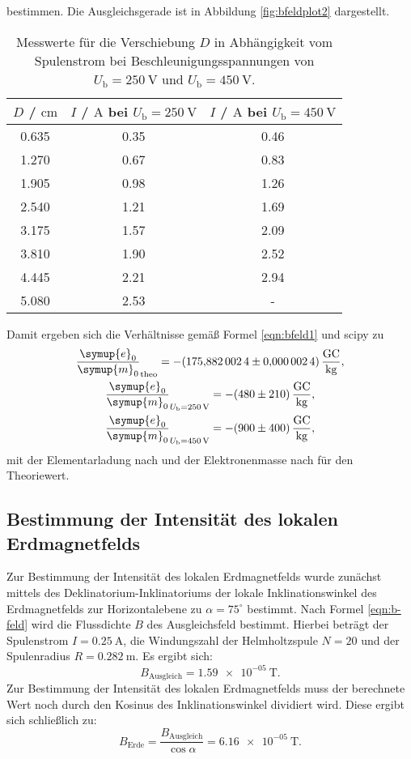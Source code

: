 bestimmen. Die Ausgleichsgerade ist in Abbildung \ref{fig:bfeldplot2} dargestellt.
\begin{table}
	\caption{Messwerte für die Verschiebung $D$ in Abhängigkeit vom Spulenstrom bei Beschleunigungsspannungen von $U_{\mathrm{b}}=\SI{250}{\volt}$ und $U_{\mathrm{b}}=\SI{450}{\volt}$.}
	\label{tab:bfeldtab}
	\centering
	\begin{tabular}{ccc}
	\toprule
		$D$ / $\si{\centi\meter}$ & $I$ / $\si{\ampere}$ bei $U_{\mathrm{b}}=\SI{250}{\volt}$ & $I$ / $\si{\ampere}$ bei $U_{\mathrm{b}}=\SI{450}{\volt}$ \\
	\midrule
		0.635 & 0.35 & 0.46 \\
		1.270 & 0.67 & 0.83 \\
		1.905 & 0.98 & 1.26 \\
		2.540 & 1.21 & 1.69 \\
		3.175 & 1.57 & 2.09 \\
		3.810 & 1.90 & 2.52 \\
		4.445 & 2.21 & 2.94 \\
		5.080 & 2.53 & - \\
	\bottomrule
	\end{tabular}
\end{table}
Damit ergeben sich die Verhältnisse gemäß Formel \eqref{eqn:bfeld1} und scipy \cite{scipy} zu
\begin{gather*}
	\frac{\symup{e}_0}{\symup{m}_0}_{\mathrm{theo}} =  -\SI{175.8820024(24)}{\giga\coulomb\per\kilo\gram} \mathrm{,} \\
	\frac{\symup{e}_0}{\symup{m}_0}_{U_{\mathrm{b}} = \SI{250}{\volt}} = -\SI{480(210)}{\giga\coulomb\per\kilo\gram} \mathrm{,} \\
	\frac{\symup{e}_0}{\symup{m}_0}_{U_{\mathrm{b}} = \SI{450}{\volt}} = -\SI{900(400)}{\giga\coulomb\per\kilo\gram} \mathrm{,}
\end{gather*}
mit der Elementarladung nach \cite{e} und der Elektronenmasse nach \cite{m} für den Theoriewert.
\subsection{Bestimmung der Intensität des lokalen Erdmagnetfelds}
Zur Bestimmung der Intensität des lokalen Erdmagnetfelds wurde zunächst mittels des Deklinatorium-Inklinatoriums der lokale Inklinationswinkel des Erdmagnetfelds zur Horizontalebene zu $\alpha=75^\circ$ bestimmt.
Nach Formel \eqref{eqn:b-feld} wird die Flussdichte $B$ des Ausgleichsfeld bestimmt.
Hierbei beträgt der Spulenstrom $I=\SI{0.25}{\ampere}$, die Windungszahl der Helmholtzspule $N=20$ und der Spulenradius $R=\SI{0.282}{\meter}$.
Es ergibt sich:
\begin{equation}
  B_\mathrm{Ausgleich}=\SI{1.59e-05}{\tesla} \text{.}
\end{equation}
Zur Bestimmung der Intensität des lokalen Erdmagnetfelds muss der berechnete Wert noch durch den Kosinus des Inklinationswinkel dividiert wird.
Diese ergibt sich schließlich zu:
\begin{equation}
  B_\mathrm{Erde}=\frac{B_\mathrm{Ausgleich}}{\cos{\alpha}}=\SI{6.16e-05}{\tesla} \text{.}
\end{equation}

